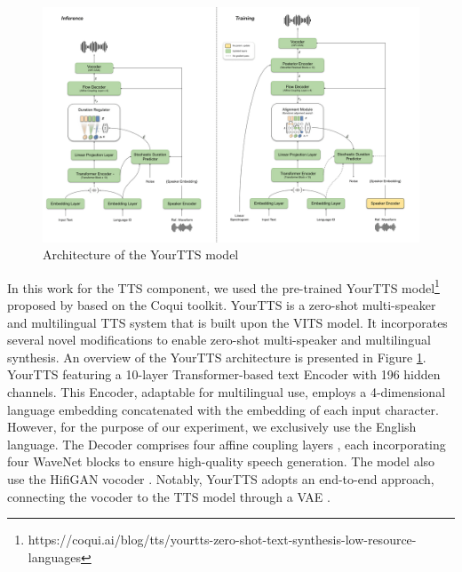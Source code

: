 \begin{figure}
    \begin{center}
        \includegraphics[scale=0.4]{imgs/YourTTS.png}
        \caption{Architecture of the YourTTS model\protect\footnotemark}
        \label{fig:YourTTS}
    \end{center}
\end{figure}

In this work for the \ac{TTS} component, we used the pre-trained YourTTS model\footnote{https://coqui.ai/blog/tts/yourtts-zero-shot-text-synthesis-low-resource-languages} proposed by \cite{casanova2022yourtts} based on the  Coqui toolkit. YourTTS is a zero-shot multi-speaker and multilingual \ac{TTS} system that is built upon the \ac{VITS} model. It incorporates several novel modifications to enable zero-shot multi-speaker and multilingual synthesis. An overview of the YourTTS architecture is presented in Figure \ref{fig:YourTTS}.
YourTTS featuring a 10-layer Transformer-based text Encoder with 196 hidden channels. This Encoder, adaptable for multilingual use, employs a 4-dimensional language embedding concatenated with the embedding of each input character. However, for the purpose of our experiment, we exclusively use the English language. The Decoder comprises four affine coupling layers \cite{45819}, each incorporating four WaveNet blocks \cite{45774} to ensure high-quality speech generation. The model also use the HifiGAN vocoder \cite{kong2020hifi}. Notably, YourTTS adopts an end-to-end approach, connecting the vocoder to the \ac{TTS} model through a \ac{VAE} \cite{VAE}.


